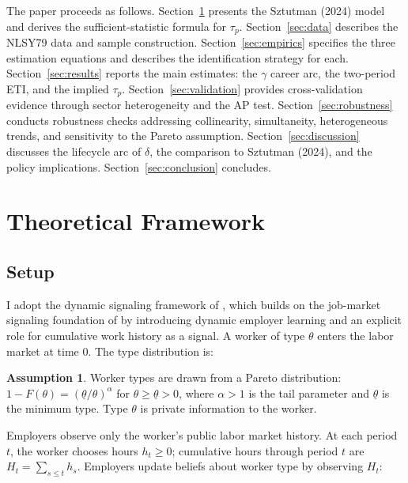 \documentclass[12pt]{article}
\theoremstyle{definition}
\newtheorem{assumption}{Assumption}
\theoremstyle{remark}
\begin{document}
The paper proceeds as follows. Section~\ref{sec:model} presents the Sztutman (2024) model and
derives the sufficient-statistic formula for $\tau_p$. Section~\ref{sec:data} describes the
NLSY79 data and sample construction. Section~\ref{sec:empirics} specifies the three estimation
equations and describes the identification strategy for each. Section~\ref{sec:results} reports
the main estimates: the $\gamma$ career arc, the two-period ETI, and the implied $\tau_p$.
Section~\ref{sec:validation} provides cross-validation evidence through sector heterogeneity
and the AP test. Section~\ref{sec:robustness} conducts robustness checks addressing
collinearity, simultaneity, heterogeneous trends, and sensitivity to the Pareto assumption.
Section~\ref{sec:discussion} discusses the lifecycle arc of $\delta$, the comparison to
Sztutman (2024), and the policy implications. Section~\ref{sec:conclusion} concludes.

\section{Theoretical Framework}
\label{sec:model}

\subsection{Setup}

I adopt the dynamic signaling framework of \citet{sztutman2024}, which builds on the
job-market signaling foundation of \citet{spence1973job} by introducing dynamic employer
learning and an explicit role for cumulative work history as a signal. A worker of type
$\theta$ enters the labor market at time 0. The type distribution is:

\begin{assumption}
\label{ass:pareto}
Worker types are drawn from a Pareto distribution: $1 - F(\theta) = (\underline{\theta}/\theta)^\alpha$
for $\theta \geq \underline{\theta} > 0$, where $\alpha > 1$ is the tail parameter and
$\underline{\theta}$ is the minimum type. Type $\theta$ is private information to the worker.
\end{assumption}

Employers observe only the worker's public labor market history. At each period $t$, the
worker chooses hours $h_t \geq 0$; cumulative hours through period $t$ are
$H_t = \sum_{s \leq t} h_s$. Employers update beliefs about worker type by observing $H_t$:
\end{document}
